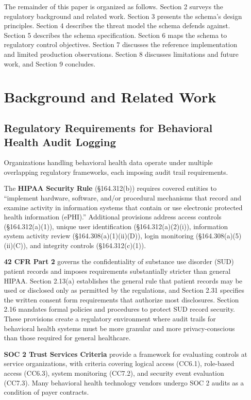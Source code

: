 \documentclass[11pt,a4paper]{article}
\begin{document}
The remainder of this paper is organized as follows. Section 2 surveys the regulatory background and related work. Section 3 presents the schema's design principles. Section 4 describes the threat model the schema defends against. Section 5 describes the schema specification. Section 6 maps the schema to regulatory control objectives. Section 7 discusses the reference implementation and limited production observations. Section 8 discusses limitations and future work, and Section 9 concludes.

\section{Background and Related Work}

\subsection{Regulatory Requirements for Behavioral Health Audit Logging}

Organizations handling behavioral health data operate under multiple overlapping regulatory frameworks, each imposing audit trail requirements.

The \textbf{HIPAA Security Rule} (\S164.312(b)) requires covered entities to ``implement hardware, software, and/or procedural mechanisms that record and examine activity in information systems that contain or use electronic protected health information (ePHI).'' Additional provisions address access controls (\S164.312(a)(1)), unique user identification (\S164.312(a)(2)(i)), information system activity review (\S164.308(a)(1)(ii)(D)), login monitoring (\S164.308(a)(5)(ii)(C)), and integrity controls (\S164.312(c)(1)).

\textbf{42 CFR Part 2} governs the confidentiality of substance use disorder (SUD) patient records and imposes requirements substantially stricter than general HIPAA. Section 2.13(a) establishes the general rule that patient records may be used or disclosed only as permitted by the regulations, and Section 2.31 specifies the written consent form requirements that authorize most disclosures. Section 2.16 mandates formal policies and procedures to protect SUD record security. These provisions create a regulatory environment where audit trails for behavioral health systems must be more granular and more privacy-conscious than those required for general healthcare.

\textbf{SOC 2 Trust Services Criteria} provide a framework for evaluating controls at service organizations, with criteria covering logical access (CC6.1), role-based access (CC6.3), system monitoring (CC7.2), and security event evaluation (CC7.3). Many behavioral health technology vendors undergo SOC 2 audits as a condition of payer contracts.
\end{document}
